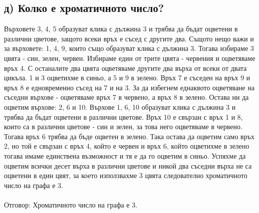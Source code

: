 \documentclass[14pt]{extarticle}
\begin{document}
\subsection*{д) Колко е хроматичното число?}
Върховете 3, 4, 5 образуват клика с дължина 3 и трябва да бъдат оцветени в различни цветове, защото всеки връх е съсед с другите два.
Същото нещо важи и за върховете: 1, 4, 9, които също образуват клика с дължина 3. Тогава избираме 3 цвята - син, зелен, червен. Избираме един от трите цвята - червения и оцветяваме връх 4. С останалите два цвята оцветяваме другите два върха от всеки от двата цикъла.
1 и 3 оцветихме в синьо, а 5 и 9 в зелено. Връх 7 е съседен на връх 9 и връх 8 е едновременно съсед на 7 и на 3. За да избегнем еднаквото оцветяване на съседни върхове - оцветяваме връх 7 в червено, а връх 8 в зелено. Остава ни да оцветим върхове: 2, 6 и 10.
Върхове 1, 6, 10 образуват клика с дължина 3 и трябва да бъдат оцветени в различни цветове. Връх 10 е свързан с връх 1 и 8, които са в различни цветове - син и зелен, за това него оцветяваме в червено. Тогава връх 6 трябва да бъде оцветен в зелено.
Така остава да оцветим само връх 2, но той е свързан с връх 4, който е червен и връх 6, който оцветихме в зелено тогава имаме единствена възможност и тя е да го оцветим в синьо.
Успяхме да оцветим всички десет върха в различни цветове и никой два съседни върха не са оцветени в един цвят, за което използвахме 3 цвята следователно хроматичното число на графа е 3.\\\\
Отговор: Хроматичното число на графа е 3. \\\\
\end{document}
